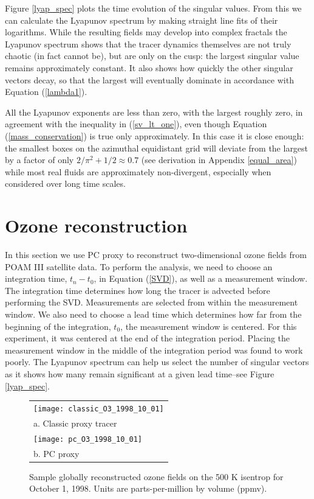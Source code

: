 Figure \ref{lyap_spec} plots the time evolution of the singular values.
From this we can calculate the Lyapunov spectrum by making straight line
fits of their logarithms.
While the resulting fields may develop into complex fractals \citep{Mills2009}
the Lyapunov spectrum shows that the tracer dynamics themselves 
are not truly chaotic (in fact cannot be), but are
only on the cusp: the largest singular value remains approximately constant.
It also shows how quickly the other singular vectors decay,
so that the largest will eventually dominate in accordance with
Equation (\ref{lambda1}).

All the Lyapunov exponents are less than zero, with the largest roughly zero, 
in agreement with the inequality in (\ref{sv_lt_one}),
even though Equation (\ref{mass_conservation}) is true only approximately.
In this case it is close enough: the smallest boxes on the
azimuthal equidistant grid will deviate from the largest by
a factor of only $2/\pi^2+1/2\approx0.7$ (see derivation in
Appendix \ref{equal_area})
while most real fluids are approximately non-divergent, especially
when considered over long time scales.

\section{Ozone reconstruction}

In this section we use PC proxy to reconstruct two-dimensional ozone fields 
from POAM III satellite data.
To perform the analysis, we need to choose an integration time, 
$t_n-t_0$, in Equation (\ref{SVD}), as well as a measurement window.
The integration time determines how long the tracer is advected 
before performing the SVD.
Measurements are selected from within the measurement window.
We also need to choose a lead time which determines how far from the
beginning of the integration, $t_0$, the measurement window is centered.
For this experiment, it was centered at the end of the integration period.
Placing the measurement window in the middle of the integration period
was found to work poorly.
The Lyapunov spectrum can help us select the number of singular vectors
as it shows how many remain significant at
a given lead time--see Figure \ref{lyap_spec}.

\begin{figure}
  \begin{tabular}{l}
    \texttt{[image: classic\_O3\_1998\_10\_01]} \\
    a. Classic proxy tracer \\
    \texttt{[image: pc\_O3\_1998\_10\_01]} \\
    b. PC proxy
  \end{tabular}
  \caption{Sample globally reconstructed ozone fields on the 500 K isentrop for October 1, 1998. Units are parts-per-million by volume (ppmv).}
  \label{sample_O3_field}
\end{figure}

